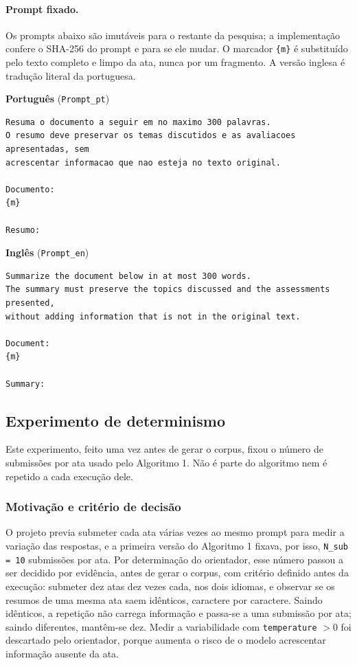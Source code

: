 \documentclass[12pt]{article}
\begin{document}
\paragraph{Prompt fixado.} Os prompts abaixo são imutáveis para o restante da
pesquisa; a implementação confere o SHA-256 do prompt e para se ele mudar. O
marcador \texttt{\{m\}} é substituído pelo texto completo e limpo da ata, nunca
por um fragmento. A versão inglesa é tradução literal da portuguesa.

\noindent\textbf{Português} (\texttt{Prompt\_pt})
\begin{lstlisting}
Resuma o documento a seguir em no maximo 300 palavras.
O resumo deve preservar os temas discutidos e as avaliacoes apresentadas, sem
acrescentar informacao que nao esteja no texto original.

Documento:
{m}

Resumo:
\end{lstlisting}

\noindent\textbf{Inglês} (\texttt{Prompt\_en})
\begin{lstlisting}
Summarize the document below in at most 300 words.
The summary must preserve the topics discussed and the assessments presented,
without adding information that is not in the original text.

Document:
{m}

Summary:
\end{lstlisting}

\subsection{Experimento de determinismo}\label{sec:determinismo}

Este experimento, feito uma vez antes de gerar o corpus, fixou o número de
submissões por ata usado pelo Algoritmo 1. Não é parte do algoritmo nem é
repetido a cada execução dele.

\subsubsection{Motivação e critério de decisão}\label{sec:det-motivacao}

O projeto previa submeter cada ata várias vezes ao mesmo prompt para medir a
variação das respostas, e a primeira versão do Algoritmo 1 fixava, por isso,
\texttt{N\_sub = 10} submissões por ata. Por determinação do orientador, esse
número passou a ser decidido por evidência, antes de gerar o corpus, com
critério definido antes da execução: submeter dez atas dez vezes cada, nos dois
idiomas, e observar se os resumos de uma mesma ata saem idênticos, caractere
por caractere. Saindo idênticos, a repetição não carrega informação e passa-se
a uma submissão por ata; saindo diferentes, mantêm-se dez. Medir a
variabilidade com \texttt{temperature} $> 0$ foi descartado pelo orientador,
porque aumenta o risco de o modelo acrescentar informação ausente da ata.
\end{document}
